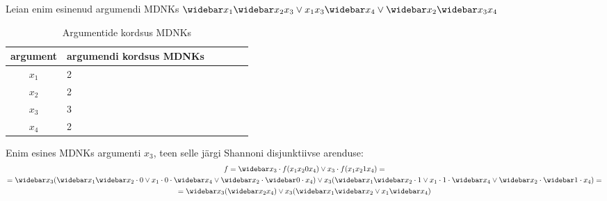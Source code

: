 Leian enim esinenud argumendi MDNKs $\wb{x_1}\wb{x_2}x_3 \lor x_1x_3\wb{x_4} \lor \wb{x_2}\wb{x_3}x_4$
\begin{table}[H]
\centering
\caption{Argumentide kordsus MDNKs}
\label{my-label}
\begin{tabular}{|c|l|l|l|l||l|}
\hline
argument & argumendi kordsus MDNKs \\ \hline
$x_1$ & 2                                                                     \\ \hline
$x_2$ & 2                                                                     \\ \hline
$x_3$ & 3                                                                     \\ \hline
$x_4$ & 2                                                                     \\ \hline
\end{tabular}
\end{table}
Enim esines MDNKs argumenti $x_3$, teen selle järgi Shannoni disjunktiivse arenduse:
\begin{multline*}
f=\wb{x_3} \cdot f(x_1x_2 0 x_4) \lor x_3 \cdot f(x_1x_2 1 x_4)=\\
=\wb{x_3}(\wb{x_1}\wb{x_2} \cdot 0 \lor x_1 \cdot 0 \cdot \wb{x_4} \lor \wb{x_2} \cdot \wb{0} \cdot x_4) \lor x_3(\wb{x_1}\wb{x_2} \cdot 1 \lor x_1 \cdot 1 \cdot \wb{x_4} \lor \wb{x_2} \cdot \wb{1} \cdot x_4)=\\
=\wb{x_3}(\wb{x_2}x_4) \lor x_3(\wb{x_1}\wb{x_2} \lor x_1\wb{x_4})\\
\end{multline*}